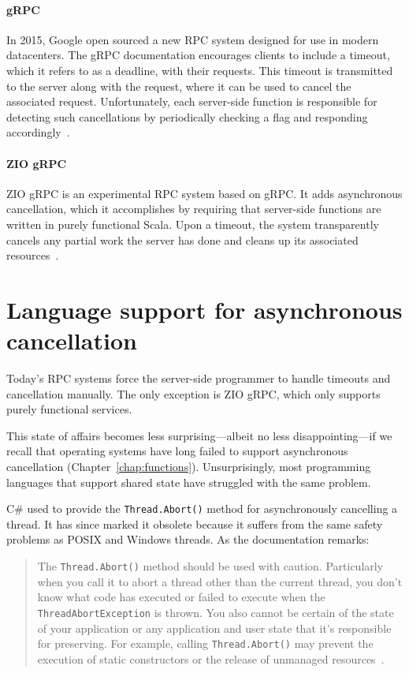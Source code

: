 \paragraph{gRPC}
In 2015, Google open sourced a new RPC system designed for use in modern datacenters.
The gRPC documentation encourages clients to include a timeout, which it refers to as
a deadline, with their requests.  This timeout is transmitted to the server along
with the request, where it can be used to cancel the associated request.
Unfortunately, each server-side function is responsible for detecting such
cancellations by periodically checking a flag and responding
accordingly~\cite{www-grpc}.

\paragraph{ZIO gRPC}
ZIO gRPC is an experimental RPC system based on gRPC.  It adds asynchronous
cancellation, which it accomplishes by requiring that server-side functions are
written in purely functional Scala.  Upon a timeout, the system transparently cancels
any partial work the server has done and cleans up its associated
resources~\cite{www-zio-grpc}.


\section{Language support for asynchronous cancellation}

Today's RPC systems force the server-side programmer to handle timeouts and
cancellation manually.  The only exception is ZIO gRPC, which only supports purely
functional services.

This state of affairs becomes less surprising---albeit no less disappointing---if we
recall that operating systems have long failed to support asynchronous cancellation
(Chapter~\ref{chap:functions}).  Unsurprisingly, most programming languages that
support shared state have struggled with the same problem.

C\# used to provide the \texttt{Thread.Abort()} method for asynchronously cancelling
a thread.  It has since marked it obsolete because it suffers from the same safety
problems as POSIX and Windows threads.  As the documentation remarks:
\begin{quote}
The \texttt{Thread.Abort()} method should be used with caution.  Particularly when
you call it to abort a thread other than the current thread, you don't know what code
has executed or failed to execute when the \texttt{ThreadAbortException} is thrown.
You also cannot be certain of the state of your application or any application and
user state that it's responsible for preserving.  For example, calling
\texttt{Thread.Abort()} may prevent the execution of static constructors or the
release of unmanaged resources~\cite{www-csharp-abort}.
\end{quote}

